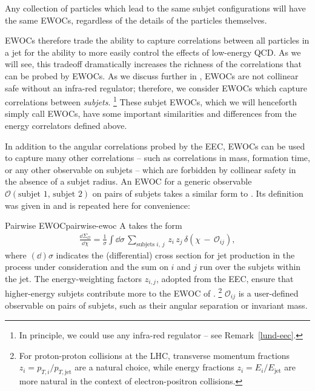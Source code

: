 Any collection of particles which lead to the same subjet configurations will have the same EWOCs, regardless of the details of the particles themselves.

EWOCs therefore trade the ability to capture correlations between all particles in a jet for the ability to more easily control the effects of low-energy QCD.
%
As we will see, this tradeoff dramatically increases the richness of the correlations that can be probed by EWOCs.
As we discuss further in , EWOCs are not collinear safe without an infra-red regulator;
%
therefore, we consider EWOCs which capture correlations between \textit{subjets}.%
\footnote{
    In principle, we could use any infra-red regulator -- see Remark~\ref{lund-eec}.
}
%
These subjet EWOCs, which we will henceforth simply call EWOCs, have some important similarities and differences from the energy correlators defined above.



In addition to the angular correlations probed by the EEC, EWOCs can be used to capture many other correlations -- such as correlations in mass, formation time, or any other observable on subjets -- which are forbidden by collinear safety in the absence of a subjet radius.
%
An EWOC for a generic observable \(\mathcal{O}(\text{subjet 1, subjet 2})\) on pairs of subjets takes a similar form to .
%
Its definition was given in  and is repeated here for convenience:
%
\begin{definitionbox}{Pairwise EWOC}{pairwise-ewoc}
    A  takes the form
    \begin{align}
        \label{eq:intro_ewoc_def}
        \frac{\dd \Sigma_\mathcal{O}}{\dd \chi}
        =
        \frac{1}{\sigma}
        \int \dd\sigma \,
        \sum_{
            \text{subjets }
            i,\, j
        } \,
        z_i \, z_j \,
        \delta\left(\chi \, - \, \mathcal{O}_{ij}\right)
        ,
    \end{align}
    where \((\dd)\sigma\) indicates the (differential) cross section for jet production in the process under consideration and the sum on \(i\) and \(j\) run over the subjets within the jet.
    The energy-weighting factors \(z_{i,j}\), adopted from the EEC, ensure that higher-energy subjets contribute more to the EWOC of .%
    \footnote{
        For proton-proton collisions at the LHC, transverse momentum fractions \(z_i = p_{T,i}/p_{T,\text{jet}}\) are a natural choice, while energy fractions \(z_{i} = E_{i}/E_\text{jet}\) are more natural in the context of electron-positron collisions.
    }
    \(\mathcal{O}_{ij}\) is a user-defined  observable on pairs of subjets, such as their angular separation or invariant mass.
\end{definitionbox}



